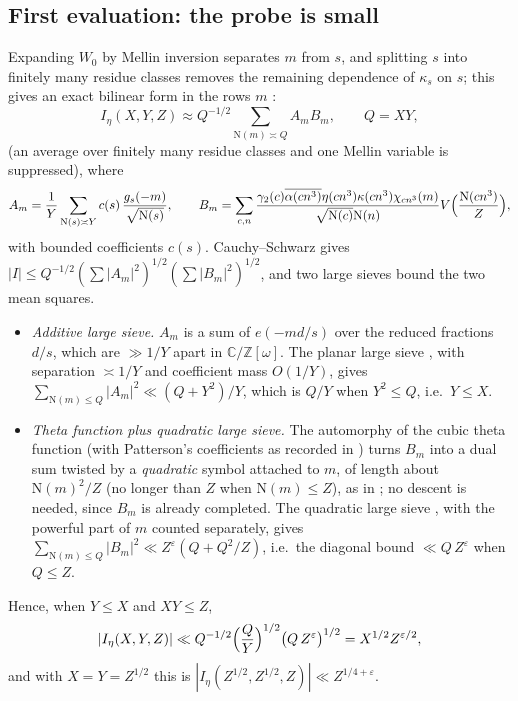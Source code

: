 \documentclass[11pt]{article}
\newcommand{\OO}{\mathbb Z[\omega]}
\newcommand{\N}{\mathrm N}
\begin{document}
\subsection{First evaluation: the probe is small}\label{sec:low}
Expanding $W_0$ by Mellin inversion separates $m$ from $s$, and splitting $s$ into finitely many
residue classes removes the remaining dependence of $\kappa_s$ on $s$; this gives
an exact bilinear form in the rows $m$ \cite[eq.\ low-separated, L3470]{OAI78}:
\begin{equation}\label{eq:bilinear}
 I_\eta(X,Y,Z)\approx Q^{-1/2}\sum_{\N(m)\asymp Q}A_m B_m,
 \qquad Q=XY,
\end{equation}
(an average over finitely many residue classes and one Mellin variable is
suppressed), where
\[
 A_m=\frac1Y\sum_{\N(s)\asymp Y}c(s)\,\frac{g_s(-m)}{\sqrt{\N(s)}},\qquad
 B_m=\sum_{c,n}\frac{\gamma_2(c)\overline{\alpha(cn^3)}\eta(cn^3)\kappa(cn^3)
       \chi_{cn^3}(m)}{\sqrt{\N(c)}\N(n)}V\Bigl(\frac{\N(cn^3)}Z\Bigr),
\]
with bounded coefficients $c(s)$. Cauchy--Schwarz gives
$|I|\le Q^{-1/2}(\sum|A_m|^2)^{1/2}(\sum|B_m|^2)^{1/2}$, and two large
sieves bound the two mean squares.
\begin{itemize}
\item \emph{Additive large sieve.} $A_m$ is a sum of $e(-md/s)$ over the
 reduced fractions $d/s$, which are $\gg1/Y$ apart in $\mathbb C/\OO$. The
 planar large sieve \cite[Lemma lem:planar-additive-sieve]{OAI78}, with separation
 $\asymp1/Y$ and coefficient mass $O(1/Y)$, gives \cite[Lemma lem:balanced-additive-norm]{OAI78}
 $\sum_{\N(m)\le Q}|A_m|^2\ll(Q+Y^2)/Y$, which is $Q/Y$ when $Y^2\le Q$, i.e.\ $Y\le X$.
\item \emph{Theta function plus quadratic large sieve.} The automorphy of the cubic theta
 function (with Patterson's coefficients as recorded in \cite{DR}) turns $B_m$ into a dual sum
 twisted by a \emph{quadratic} symbol attached to $m$, of length about $\N(m)^2/Z$ (no
 longer than $Z$ when $\N(m)\le Z$), as in \cite[Section 7]{guide1112}; no descent is
 needed, since $B_m$ is already completed. The quadratic large sieve \cite{GL}, with the
 powerful part of $m$ counted separately, gives \cite[Lemma lem:unmarked-completed-moment]{OAI78}
 $\sum_{\N(m)\le Q}|B_m|^2\ll Z^\varepsilon(Q+Q^2/Z)$, i.e.\ the diagonal bound
 $\ll Q\,Z^{\varepsilon}$ when $Q\le Z$.
\end{itemize}
Hence, when $Y\le X$ and $XY\le Z$,
\[
 |I_\eta(X,Y,Z)|\ll Q^{-1/2}\Bigl(\frac QY\Bigr)^{1/2}\bigl(Q\,Z^{\varepsilon}\bigr)^{1/2}
 =X^{1/2}Z^{\varepsilon/2},
\]
and with $X=Y=Z^{1/2}$ this is \cite[Prop.\ prop:balanced-low]{OAI78}
$|I_\eta(Z^{1/2},Z^{1/2},Z)|\ll Z^{1/4+\varepsilon}$.
\end{document}
